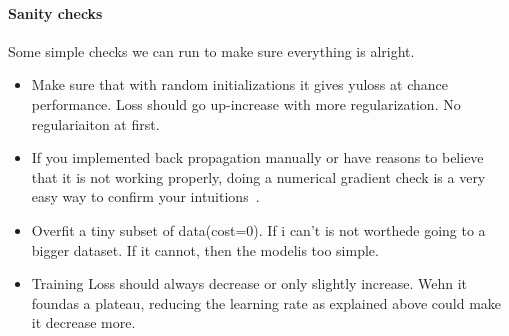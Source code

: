 

\paragraph{Sanity checks}
Some simple checks we can run to make sure everything is alright. 
\begin{itemize}
	\item Make sure that with random initializations it gives yuloss at chance performance. Loss should go up-increase with more regularization. No regulariaiton at first.

	\item If you implemented back propagation manually or have reasons to believe that it is not working properly, doing a numerical gradient check is a very easy way to confirm your intuitions~\cite{Karpathy2015}.

		\item Overfit a tiny subset of data(cost=0). If i can't is not worthede going to a bigger dataset. If it cannot, then the modelis too simple.

	\item Training Loss should always decrease or only slightly increase. Wehn it foundas a plateau, reducing the learning rate as explained above could make it decrease more. 

\end{itemize}


